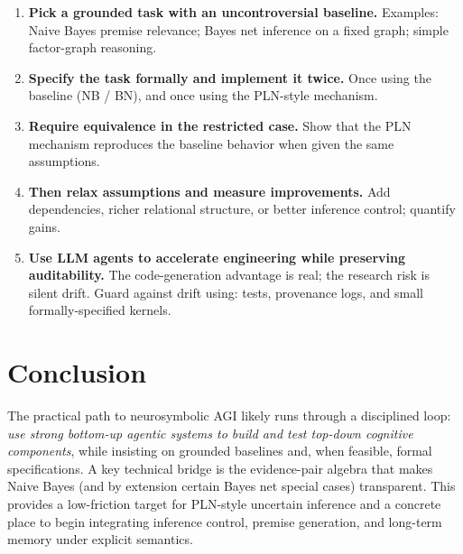 \documentclass[11pt]{article}
\begin{document}
\begin{enumerate}[leftmargin=*]
\item \textbf{Pick a grounded task with an uncontroversial baseline.}
Examples: Naive Bayes premise relevance; Bayes net inference on a fixed graph; simple factor-graph reasoning.
\item \textbf{Specify the task formally and implement it twice.}
Once using the baseline (NB / BN), and once using the PLN-style mechanism.
\item \textbf{Require equivalence in the restricted case.}
Show that the PLN mechanism reproduces the baseline behavior when given the same assumptions.
\item \textbf{Then relax assumptions and measure improvements.}
Add dependencies, richer relational structure, or better inference control; quantify gains.
\item \textbf{Use LLM agents to accelerate engineering while preserving auditability.}
The code-generation advantage is real; the research risk is silent drift. Guard against drift using:
tests, provenance logs, and small formally-specified kernels.
\end{enumerate}

\section{Conclusion}

The practical path to neurosymbolic AGI likely runs through a disciplined loop:
\emph{use strong bottom-up agentic systems to build and test top-down cognitive components},
while insisting on grounded baselines and, when feasible, formal specifications.
A key technical bridge is the evidence-pair algebra that makes Naive Bayes (and by extension certain
Bayes net special cases) transparent. This provides a low-friction target for PLN-style uncertain inference
and a concrete place to begin integrating inference control, premise generation, and long-term
memory under explicit semantics.
\end{document}
